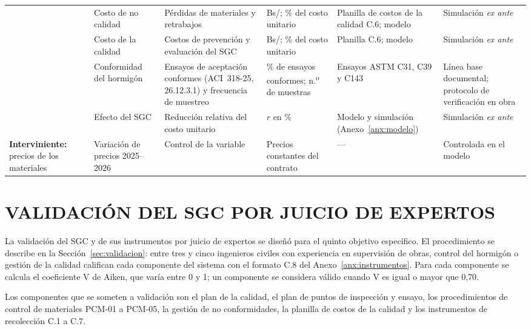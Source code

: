 \begin{landscape}
\begin{longtable}{@{}P{2.4cm}P{3.0cm}P{4.6cm}P{3.6cm}P{3.3cm}P{4.6cm}@{}}
& Costo de no calidad & Pérdidas de materiales y retrabajos & Bs/\mdos{}; \% del costo unitario & Planilla de costos de la calidad C.6; modelo & Simulación \emph{ex ante} \\
& Costo de la calidad & Costos de prevención y evaluación del SGC & Bs/\mdos{}; \% del costo unitario & Planilla C.6; modelo & Simulación \emph{ex ante} \\
& Conformidad del hormigón & Ensayos de aceptación conformes (ACI~318-25, 26.12.3.1) y frecuencia de muestreo & \% de ensayos conformes; n.\textsuperscript{o} de muestras & Ensayos ASTM C31, C39 y C143 & Línea base documental; protocolo de verificación en obra \\
& Efecto del SGC & Reducción relativa del costo unitario & $r$ en \% & Modelo y simulación (Anexo~\ref{anx:modelo}) & Simulación \emph{ex ante} \\
\midrule
\textbf{Interviniente:} precios de los materiales
& Variación de precios 2025--2026 & Control de la variable & Precios constantes del contrato & --- & Controlada en el modelo \\
\end{longtable}
\endgroup
{}
\end{landscape}


\chapter{VALIDACIÓN DEL SGC POR JUICIO DE EXPERTOS}
\label{anx:validacion}
La validación del SGC y de sus instrumentos por juicio de expertos se diseñó para el quinto objetivo específico. El procedimiento se describe en la Sección~\ref{sec:validacion}: entre tres y cinco ingenieros civiles con experiencia en supervisión de obras, control del hormigón o gestión de la calidad califican cada componente del sistema con el formato C.8 del Anexo~\ref{anx:instrumentos}. Para cada componente se calcula el coeficiente V de Aiken, que varía entre 0 y 1; un componente se considera válido cuando V es igual o mayor que 0,70.

Los componentes que se someten a validación son el plan de la calidad, el plan de puntos de inspección y ensayo, los procedimientos de control de materiales PCM-01 a PCM-05, la gestión de no conformidades, la planilla de costos de la calidad y los instrumentos de recolección C.1 a C.7.

